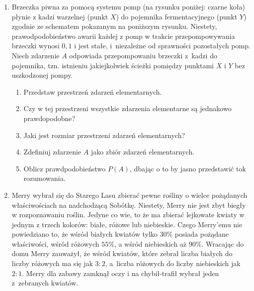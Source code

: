 \documentclass{mwart}
\newcommand{\abs}[1]{\left|#1\right|}
\newcommand{\ans}[1]{}
\newcommand{\ans}[1]{\emph{Odpowiedź:} #1}
\begin{document}
\begin{enumerate}
\item Brzeczka piwna za pomocą systemu pomp (na rysunku poniżej: czarne koła)
płynie z kadzi warzelnej (punkt $X$) do pojemnika fermentacyjnego (punkt $Y$)
	zgodnie ze schematem pokazanym na poniższym rysunku. Niestety,
	prawodpodobieństwo awarii każdej z pomp w trakcie przepompowywania brzeczki
	wynosi $0{,}1$ i jest stałe, i~niezależne od sprawności pozostałych pomp.
	Niech zdarzenie $A$ odpowiada przepompowaniu brzeczki z~kadzi do pojemnika,
	tzn. istnieniu jakiejkolwiek ścieżki pomiędzy punktami $X$ i $Y$ bez
	uszkodzonej pompy.
\begin{enumerate}
\item Przedstaw przestrzeń zdarzeń elementarnych. \ans{$\Omega=\{\omega_{i_1,\ldots,i_4}|i_j\in\{0,1\}\}$}
\item Czy w tej przestrzeni wszystkie zdarzenia elementarne są jednakowo prawdopodobne? \ans{Nie}
\item Jaki jest rozmiar przestrzeni zdarzeń elementarnych? \ans{$\abs{\Omega}=2^4$}
\item Zdefiniuj zdarzenie $A$ jako zbiór zdarzeń elementarnych. \ans{$A=\{
	\omega_{1111},\omega_{1110},\omega_{1101},
		\omega_{1011},\omega_{1010},\omega_{1001},
		\omega_{0111},\omega_{0110},\omega_{0101}
	\}$}
	\item Oblicz prawdpodobieństwo $P(A)$, dbając o to by jasno przedstawić tok rozumowania. \ans{$P(A)=0{,}9^4+4\cdot0{,}9^3\cdot0{,}1+4\cdot0{,}9^2\cdot0{,}1^2=0{,}9801=(0{,}9+0{,}9-0{,}9^2)^2$, np. $P(\omega_{1111})=P(A_1)P(A_2)P(A_3)P(A_4)$}
\end{enumerate}
\clearpage
\item Merry wybrał się do Starego Lasu zbierać pewne rośliny o wielce pożądanych właściwościach na nadchodzącą Sobótkę.
Niestety, Merry nie jest zbyt biegły w rozpoznawaniu roślin.
Jedyne co wie, to że ma zbierać lejkowate kwiaty w jednym z trzech kolorów: białe, różowe lub niebieskie.
Czego Merry'emu nie powiedziano to, że wśród białych kwiatów tylko $30\%$ posiada pożądane właściwości, wśród różowych $55\%$, a wśród niebieskich
aż $90\%$.
Wracając do domu Merry zauważył, że wśród kwiatów, które zebrał liczba białych do liczby różowych ma się jak $3:2$, a~liczba różowych do
liczby niebieskich jak $2:1$. Merry dla zabawy zamknął oczy i na chybił-trafił wybrał jeden z~zebranych kwiatów.
 

\end{enumerate}
\end{document}
